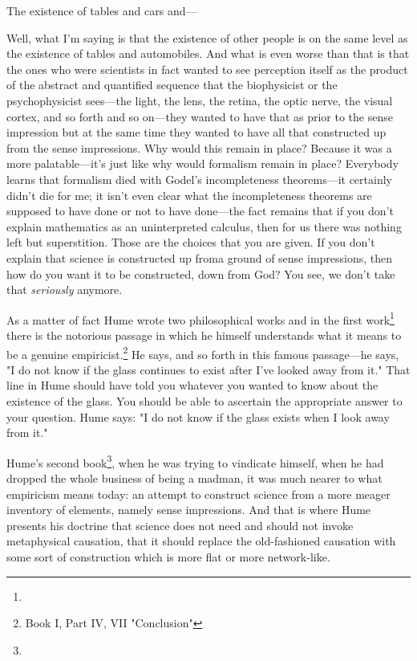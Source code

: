  The existence of tables and cars and--- 

 Well, what I'm saying is that the existence of other people is on 
the same level as the existence of tables and automobiles. And what is 
even worse than that is that the ones who were scientists in fact wanted 
to see perception itself as the product of the abstract and quantified 
sequence that the biophysicist or the psychophysicist sees---the light, 
the lens, the retina, the optic nerve, the visual cortex, and so forth and 
so on---they wanted to have that as prior to the sense impression but at 
the same time they wanted to have all that constructed up from the 
sense impressions. Why would this remain in place? Because it was a 
more palatable---it's just like why would formalism remain in place? 
Everybody learns that formalism died with Godel's incompleteness 
theorems---it certainly didn't die for me; it isn't even clear what the 
incompleteness theorems are supposed to have done or not to have 
done---the fact remains that if you don't explain mathematics as an 
uninterpreted calculus, then for us there was nothing left but 
superstition. Those are the choices that you are given. If you don't explain that 
science is constructed up froma ground of sense impressions, then how 
do you want it to be constructed, down from God? You see, we don't 
take that \emph{seriously} anymore. 

As a matter of fact Hume wrote two philosophical works and in 
the first work\footnote{}
there is the notorious passage in which he himself 
understands what it means to be a genuine empiricist.\footnote{Book I, Part IV, VII "Conclusion"}
He says,  and so forth in this famous 
passage---he says, 
"I do not know if the glass continues to exist after I've looked away from it." 
That line in Hume should have told you 
whatever you wanted to know about the existence of the glass. You 
should be able to ascertain the appropriate answer to your question. 
Hume says: "I do not know if the glass exists when I look away from it." 

Hume's second book\footnote{}, 
when he was trying to vindicate himself, 
when he had dropped the whole business of being a madman, it was 
much nearer to what empiricism means today: an attempt to construct 
science from a more meager inventory of elements, namely sense 
impressions. And that is where Hume presents his doctrine that science 
does not need and should not invoke metaphysical causation, that it 
should replace the old-fashioned causation with some sort of construction 
which is more flat or more network-like. 

